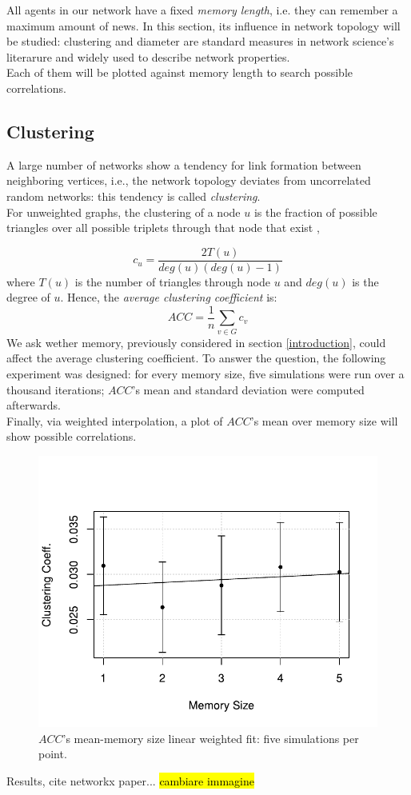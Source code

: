 All agents in our network have a fixed \textit{memory length}, i.e. they can remember a maximum
 amount of news.
In this section, its influence in network topology will be studied: clustering and
 diameter are standard measures in network science's literarure and widely used to describe 
 network properties.\\
  Each of them will be plotted 
 against memory length to search possible correlations.
\subsection{Clustering} \label{clustering}
A large number of networks show a tendency for link formation between neighboring vertices, 
i.e., the network topology deviates from uncorrelated random networks: this tendency is called 
\textit{clustering}. \cite{clusterarticle} \\
For unweighted graphs, the clustering of a node $u$ is the fraction of possible triangles over 
all possible triplets  through that node that exist \cite{clustersite},

\begin{equation}
\label{eq:clustering}
c_u = \frac{2 T(u)}{deg(u)(deg(u)-1)}
\end{equation}
where $T(u)$ is the number of triangles through node $u$ and $deg(u)$ is the degree of $u$.
Hence, the \textit{average clustering coefficient}  is:
\begin{equation}
\label{eq:average_clustering}
ACC = \frac{1}{n}\sum_{v \in G} c_v
\end{equation}
We ask wether memory, previously considered in section \ref{introduction}, could affect the 
average clustering coefficient.
To answer the question, the following experiment was designed:
for every memory size, five simulations were run over a thousand iterations; $ACC$'s mean and 
standard deviation were computed afterwards.\\
Finally, via weighted interpolation, a plot of $ACC$'s mean over memory size will show possible
 correlations.
\begin{figure}[h]
  \centering
  \includegraphics[trim={0cm 0cm 0cm 1cm},clip,width=.8\columnwidth]{img/clustering.pdf}
  \caption{$ACC$'s mean-memory size linear weighted fit: five simulations per point.}
  \label{fig:clustering}
\end{figure}
Results, cite networkx paper...
\hl{cambiare immagine}